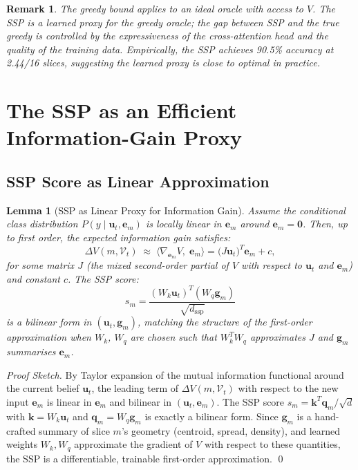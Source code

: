 \documentclass[11pt,a4paper]{article}
\newtheorem{lemma}[theorem]{Lemma}
\newtheorem{remark}{Remark}[section]
\newcommand{\bu}{\mathbf{u}}
\newcommand{\be}{\mathbf{e}}
\newcommand{\bg}{\mathbf{g}}
\newcommand{\bk}{\mathbf{k}}
\newcommand{\bq}{\mathbf{q}}
\begin{document}
\begin{remark}
The greedy bound applies to an ideal oracle with access to $V$.  The SSP is a
\emph{learned proxy} for the greedy oracle; the gap between SSP and the true
greedy is controlled by the expressiveness of the cross-attention head and the
quality of the training data.  Empirically, the SSP achieves 90.5\% accuracy
at 2.44/16 slices, suggesting the learned proxy is close to optimal in practice.
\end{remark}

\section{The SSP as an Efficient Information-Gain Proxy}

\subsection{SSP Score as Linear Approximation}

\begin{lemma}[SSP as Linear Proxy for Information Gain]
\label{lem:ssp_proxy}
Assume the conditional class distribution $P(y \mid \bu_t, \be_m)$ is locally
linear in $\be_m$ around $\be_m = \mathbf{0}$.  Then, up to first order, the
expected information gain satisfies:
\[
  \Delta V(m, \mathcal{V}_t) \;\approx\; \bigl\langle \nabla_{\be_m} V,\; \be_m \bigr\rangle
  = \bigl(J \bu_t\bigr)^T \be_m + c,
\]
for some matrix $J$ (the mixed second-order partial of $V$ with respect to $\bu_t$ and $\be_m$)
and constant $c$.  The SSP score:
\[
  s_m = \frac{(W_k \bu_t)^T (W_q \bg_m)}{\sqrt{d_\mathrm{ssp}}}
\]
is a bilinear form in $(\bu_t, \bg_m)$, matching the structure of the first-order
approximation when $W_k$, $W_q$ are chosen such that $W_k^T W_q$ approximates $J$
and $\bg_m$ summarises $\be_m$.
\end{lemma}

\begin{proof}[Proof Sketch]
By Taylor expansion of the mutual information functional around the current belief
$\bu_t$, the leading term of $\Delta V(m, \mathcal{V}_t)$ with respect to the new
input $\be_m$ is linear in $\be_m$ and bilinear in $(\bu_t, \be_m)$.
The SSP score $s_m = \bk^T \bq_m / \sqrt{d}$ with $\bk = W_k \bu_t$ and
$\bq_m = W_q \bg_m$ is exactly a bilinear form.  Since $\bg_m$ is a hand-crafted
summary of slice $m$'s geometry (centroid, spread, density), and learned weights
$W_k, W_q$ approximate the gradient of $V$ with respect to these quantities,
the SSP is a differentiable, trainable first-order approximation.  \qed
\end{proof}
\end{document}
